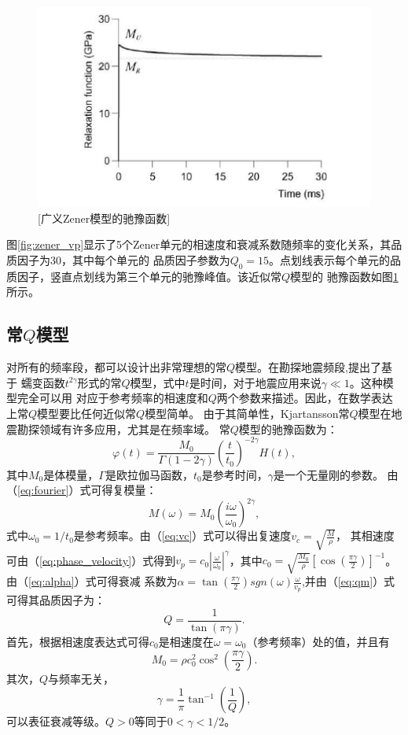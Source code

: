 \begin{figure}[!htbp]
	    \centering
		\includegraphics[width=0.7\linewidth]{figure/zener_rela}
		[广义Zener模型的驰豫函数]
		\label{fig:zener_rela}
\end{figure}
图\ref{fig:zener_vp}显示了5个Zener单元的相速度和衰减系数随频率的变化关系，其品质因子为30，其中每个单元的
品质因子参数为$Q_0=15$。点划线表示每个单元的品质因子，竖直点划线为第三个单元的驰豫峰值。该近似常$Q$模型的
驰豫函数如图\ref{fig:zener_rela}所示。


\vspace{0.5cm}
\subsection{常$Q$模型}
\vspace{0.5cm}
对所有的频率段，都可以设计出非常理想的常$Q$模型。在勘探地震频段,提出了基于
蠕变函数$t^{2\gamma}$形式的常$Q$模型，式中$t$是时间，对于地震应用来说$\gamma\ll1$。这种模型完全可以用
对应于参考频率的相速度和$Q$两个参数来描述。因此，在数学表达上常$Q$模型要比任何近似常$Q$模型简单。
由于其简单性，Kjartansson常$Q$模型在地震勘探领域有许多应用，尤其是在频率域。
常$Q$模型的驰豫函数为：
\begin{equation}
	\varphi(t)=\frac{M_0}{\Gamma(1-2\gamma)}(\frac{t}{t_0})^{-2\gamma}H(t),
\end{equation}
其中$M_0$是体模量，$\Gamma$是欧拉伽马函数，$t_0$是参考时间，$\gamma$是一个无量刚的参数。
由（\ref{eq:fourier}）式可得复模量：
\begin{equation}
	M(\omega)=M_0(\frac{i\omega}{\omega_0})^{2\gamma},
\end{equation}
式中$\omega_0=1/t_0$是参考频率。由（\ref{eq:vc}）式可以得出复速度$v_c=\sqrt{\frac{M}{\rho}}$，
其相速度可由（\ref{eq:phase_velocity}）式得到$v_p=c_0|\frac{\omega}{\omega_0}|^\gamma$，其中$c_0=
\sqrt{\frac{M_0}{\rho}}[\cos(\frac{\pi\gamma}{2})]^{-1}$。由（\ref{eq:alpha}）式可得衰减
系数为$\alpha=\tan(\frac{\pi\gamma}{2})sgn(\omega)\frac{\omega}{v_p}$,并由（\ref{eq:qm}）式
可得其品质因子为：
\begin{equation}
	Q=\frac{1}{\tan(\pi\gamma)}.
\end{equation}
首先，根据相速度表达式可得$c_0$是相速度在$\omega=\omega_0$（参考频率）处的值，并且有
\begin{equation}
	M_0=\rho c_0^2\cos^2(\frac{\pi\gamma}{2}).
\end{equation}
其次，$Q$与频率无关，
\begin{equation}
	\gamma=\frac{1}{\pi}\tan^{-1}(\frac{1}{Q}),
\end{equation}
可以表征衰减等级。$Q>0$等同于$0<\gamma<1/2$。

